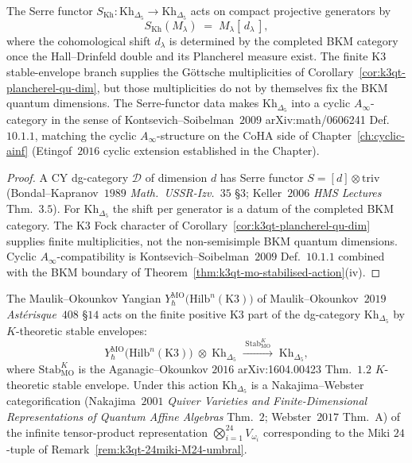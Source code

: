 \begin{corollary}
\label{cor:k3qt-khovanov-serre}
The Serre functor $S_{\mathrm{Kh}}\colon \mathrm{Kh}_{\Delta_5}
\to \mathrm{Kh}_{\Delta_5}$ acts on compact projective generators by
\[
 S_{\mathrm{Kh}}(M_\lambda) \;=\; M_\lambda[\,d_\lambda\,],
\]
where the cohomological shift $d_\lambda$ is determined by the
completed BKM category once the Hall--Drinfeld double and its
Plancherel measure exist. The finite K3 stable-envelope branch supplies
the G\"ottsche multiplicities of
Corollary~\ref{cor:k3qt-plancherel-qu-dim}, but those multiplicities do
not by themselves fix the BKM quantum dimensions. The Serre-functor
data makes
$\mathrm{Kh}_{\Delta_5}$ into a cyclic $A_\infty$-category in the
sense of Kontsevich--Soibelman~$2009$ arXiv:math/0606241 Def.\ $10.1.1$,
matching the cyclic $A_\infty$-structure on the CoHA side of
Chapter~\ref{ch:cyclic-ainf} (Etingof~$2016$ cyclic extension
established in the Chapter).
\end{corollary}

\begin{proof}
A CY dg-category $\mathcal D$ of dimension $d$ has Serre functor
$S = [d]\otimes\mathrm{triv}$ (Bondal--Kapranov~$1989$
\emph{Math.\ USSR-Izv.}~$35$ \S $3$; Keller~$2006$
\emph{HMS Lectures} Thm.\ $3.5$). For $\mathrm{Kh}_{\Delta_5}$ the
shift per generator is a datum of the completed BKM category. The K3
Fock character of Corollary~\ref{cor:k3qt-plancherel-qu-dim} supplies
finite multiplicities, not the non-semisimple BKM quantum dimensions.
Cyclic $A_\infty$-compatibility is Kontsevich--Soibelman~$2009$
Def.\ $10.1.1$ combined with the BKM boundary of
Theorem~\ref{thm:k3qt-mo-stabilised-action}(iv).
\end{proof}

\begin{theorem}
\label{thm:k3qt-khovanov-mo-action}
The Maulik--Okounkov Yangian
$Y^{\mathrm{MO}}_\hbar\bigl(\mathrm{Hilb}^n(\mathrm{K3})\bigr)$
of Maulik--Okounkov~$2019$ \emph{Ast\'erisque}~$408$ \S $14$ acts on
the finite positive K3 part of the dg-category $\mathrm{Kh}_{\Delta_5}$ by $K$-theoretic
stable envelopes:
\[
 Y^{\mathrm{MO}}_\hbar\bigl(\mathrm{Hilb}^n(\mathrm{K3})\bigr)
 \;\otimes\;
 \mathrm{Kh}_{\Delta_5}
 \;\xrightarrow{\;\mathrm{Stab}^{K}_{\mathrm{MO}}\;}\;
 \mathrm{Kh}_{\Delta_5},
\]
where $\mathrm{Stab}^{K}_{\mathrm{MO}}$ is the Aganagic--Okounkov
$2016$ arXiv:1604.00423 Thm.\ $1.2$ $K$-theoretic stable envelope.
Under this action $\mathrm{Kh}_{\Delta_5}$ is a Nakajima--Webster
categorification (Nakajima~$2001$ \emph{Quiver Varieties and
Finite-Dimensional Representations of Quantum Affine Algebras}
Thm.\ $2$; Webster~$2017$ Thm.\ A) of the infinite tensor-product
representation $\bigotimes_{i = 1}^{24} V_{\omega_i}$
corresponding to the Miki $24$-tuple of
Remark~\ref{rem:k3qt-24miki-M24-umbral}.
\end{theorem}


